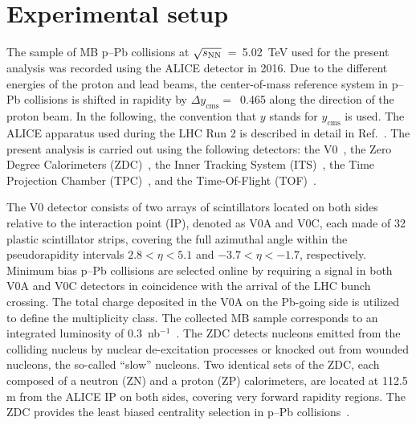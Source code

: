 \section{Experimental setup}
\label{sec:setup}
The sample of MB p--Pb collisions at $\sqrt{s_{\rm NN}}$~=~5.02~TeV used for the present analysis was recorded using the ALICE detector in 2016. Due to the different energies of the proton and lead beams, the center-of-mass reference system in p--Pb collisions is shifted in rapidity by $\Delta y_{\mathrm{cms}} =$~0.465 along the direction of the proton beam. In the following, the convention that $y$ stands for $y_{\mathrm{cms}}$ is used. The ALICE apparatus used during the LHC Run 2 is described in detail in Ref.~\cite{Abelev:2014ffa}. The present analysis is carried out using the following detectors: the V0~\cite{ALICE:2013axi}, the Zero Degree Calorimeters (ZDC)~\cite{Cortese:2019nnv}, the Inner Tracking System (ITS)~\cite{ALICE:2010tia}, the Time Projection Chamber (TPC)~\cite{Alme:2010ke}, and the Time-Of-Flight (TOF)~\cite{Jacazio:2018slq}. 

The V0 detector consists of two arrays of scintillators located on both sides relative to the interaction point (IP), denoted as V0A and V0C, each made of 32 plastic scintillator strips, covering the full azimuthal angle within the pseudorapidity intervals $2.8 < \eta < 5.1$ and $-3.7 < \eta < -1.7$, respectively. Minimum bias p--Pb collisions are selected online by requiring a signal in both V0A and V0C detectors in coincidence with the arrival of the LHC bunch crossing. The total charge deposited in the V0A on the Pb-going side is utilized to define the multiplicity class. The collected MB sample corresponds to an integrated luminosity of 0.3~nb$^{-1}$~\cite{ALICE:2014gvw}. The ZDC detects nucleons emitted from the colliding nucleus by nuclear de-excitation processes or knocked out from wounded nucleons, the so-called “slow” nucleons. Two identical sets of the ZDC, each composed of a neutron (ZN) and a proton (ZP) calorimeters, are located at 112.5 m from the ALICE IP on both sides, covering very forward rapidity regions. The ZDC provides the least biased centrality selection in p--Pb collisions~\cite{ALICE:2014xsp}.

